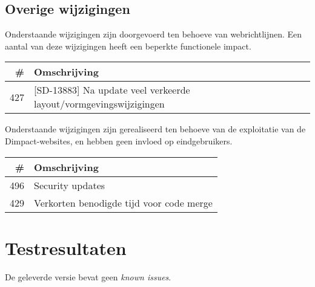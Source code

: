 \documentclass[12pt]{article}
\begin{document}
\subsection{Overige wijzigingen}

Onderstaande wijzigingen zijn doorgevoerd ten behoeve van webrichtlijnen. Een aantal van deze wijzigingen heeft een beperkte functionele impact.

\begin{tabular}{| r | p{15cm} |}
	\hline \# & Omschrijving \\ \hline \hline
	427 & [SD-13883] Na update veel verkeerde layout/vormgevingswijzigingen \\ \hline
\end{tabular}

Onderstaande wijzigingen zijn gerealiseerd ten behoeve van de exploitatie van de Dimpact-websites, en hebben geen invloed op eindgebruikers.

\begin{tabular}{| r | p{15cm} |}
	\hline \# & Omschrijving \\ \hline \hline
	496 & Security updates \\ \hline
	429 & Verkorten benodigde tijd voor code merge \\ \hline
\end{tabular}

\section{Testresultaten}
De geleverde versie bevat geen \emph{known issues}.
\end{document}
